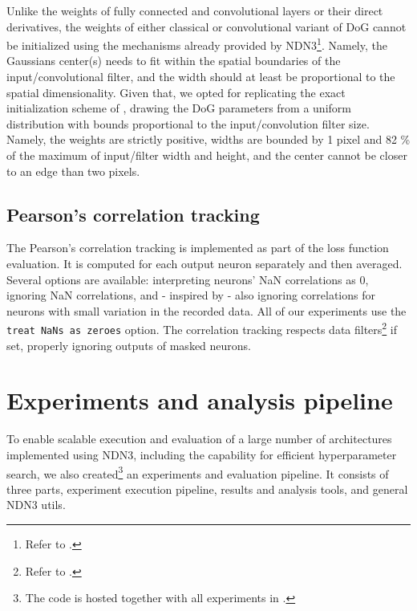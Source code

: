 Unlike the weights of fully connected and convolutional layers or their direct derivatives, the weights of either classical or convolutional variant of DoG cannot be initialized using the mechanisms already provided by NDN3\footnote{Refer to .}. Namely, the Gaussians center(s) needs to fit within the spatial boundaries of the input/convolutional filter, and the width should at least be proportional to the spatial dimensionality. Given that, we opted for replicating the exact initialization scheme of \citeauthor{antolik}, drawing the DoG parameters from a uniform distribution with bounds proportional to the input/convolution filter size. Namely, the weights are strictly positive, widths are bounded by 1 pixel and 82 \% of the maximum of input/filter width and height, and the center cannot be closer to an edge than two pixels. 

\subsection{Pearson's correlation tracking}
The Pearson's correlation tracking is implemented as part of the loss function evaluation. It is computed for each output neuron separately and then averaged. Several options are available: interpreting neurons’ NaN correlations as 0, ignoring NaN correlations, and - inspired by \cite{ecker} - also ignoring correlations for neurons with small variation in the recorded data. All of our experiments use the \texttt{treat NaNs as zeroes} option. The correlation tracking respects data filters\footnote{Refer to .} if set, properly ignoring outputs of masked neurons.

\section{Experiments and analysis pipeline}\label{ch:3.3}

To enable scalable execution and evaluation of a large number of architectures implemented using NDN3, including the capability for efficient hyperparameter search, we also created\footnote{The code is hosted together with all experiments in .} an experiments and evaluation pipeline. It consists of three parts, experiment execution pipeline, results and analysis tools, and general NDN3 utils.

